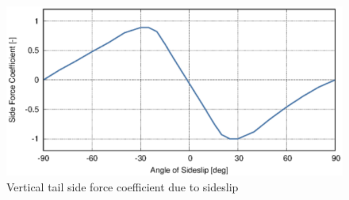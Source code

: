 \begin{figure}
  \centering
  \includegraphics[width=140mm]{eps/uh60_stab_v_cy.eps}
  \caption{Vertical tail side force coefficient due to sideslip \cite{NASA-CR-166309}}
\end{figure}
